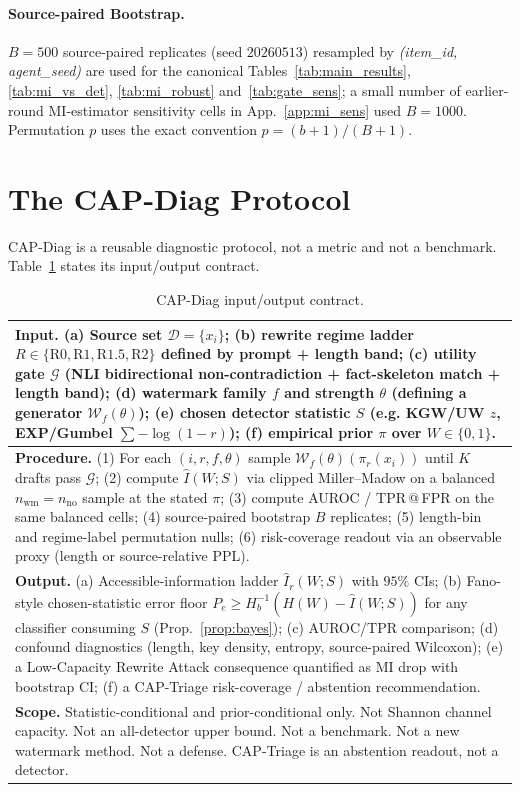 \documentclass[11pt]{article}
\begin{document}
\paragraph{Source-paired Bootstrap.}
$B=500$ source-paired replicates (seed $20260513$) resampled by
\emph{(item\_id, agent\_seed)} are used for the canonical
Tables~\ref{tab:main_results}, \ref{tab:mi_vs_det}, \ref{tab:mi_robust}
and~\ref{tab:gate_sens}; a small number of earlier-round MI-estimator
sensitivity cells in App.~\ref{app:mi_sens} used $B=1000$.
Permutation $p$ uses the exact convention $p=(b+1)/(B+1)$.

\section{The CAP-Diag Protocol}
\label{sec:capdiag}

CAP-Diag is a reusable diagnostic protocol, not a metric and not a
benchmark. Table~\ref{tab:contract} states its input/output contract.

\begin{table}[t]
\centering
\small
\caption{CAP-Diag input/output contract.}
\label{tab:contract}
\setlength{\tabcolsep}{4pt}
\begin{tabular}{p{}}
\toprule
\textbf{Input.} (a) Source set $\mathcal{D}=\{x_i\}$; (b) rewrite regime
ladder $R\in\{\mathrm{R0},\mathrm{R1},\mathrm{R1.5},\mathrm{R2}\}$ defined
by prompt + length band; (c) utility gate $\mathcal{G}$ (NLI bidirectional
non-contradiction + fact-skeleton match + length band); (d) watermark family
$f$ and strength $\theta$ (defining a generator $\mathcal{W}_f(\theta)$);
(e) chosen detector statistic $S$ (e.g. KGW/UW $z$, EXP/Gumbel
$\sum -\log(1-r)$); (f) empirical prior $\pi$ over $W\in\{0,1\}$. \\
\midrule
\textbf{Procedure.} (1) For each $(i, r, f, \theta)$ sample
$\mathcal{W}_f(\theta)(\pi_r(x_i))$ until $K$ drafts pass $\mathcal{G}$;
(2) compute $\hat I(W;S)$ via clipped Miller--Madow on a balanced
$n_{\mathrm{wm}}{=}n_{\mathrm{no}}$ sample at the stated $\pi$; (3) compute
AUROC / TPR\,@\,FPR on the same balanced cells; (4) source-paired bootstrap
$B$ replicates; (5) length-bin and regime-label permutation nulls; (6)
risk-coverage readout via an observable proxy (length or
source-relative PPL). \\
\midrule
\textbf{Output.} (a) Accessible-information ladder $\hat I_r(W;S)$ with
$95\%$ CIs; (b) Fano-style chosen-statistic error floor
$P_e \ge H_b^{-1}(H(W){-}\hat I(W;S))$ for any classifier consuming $S$
(Prop.~\ref{prop:bayes}); (c) AUROC/TPR comparison; (d) confound
diagnostics (length, key density, entropy, source-paired Wilcoxon); (e) a
Low-Capacity Rewrite Attack consequence quantified as MI drop with bootstrap
CI; (f) a CAP-Triage risk-coverage / abstention recommendation. \\
\midrule
\textbf{Scope.} Statistic-conditional and prior-conditional only. Not
Shannon channel capacity. Not an all-detector upper bound. Not a benchmark.
Not a new watermark method. Not a defense. CAP-Triage is an abstention
readout, not a detector.\\
\bottomrule
\end{tabular}
\end{table}
\end{document}
